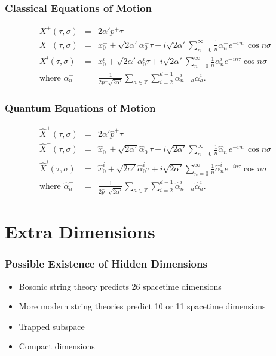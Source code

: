\documentclass{beamer}
\begin{document}
\begin{frame}
\frametitle{Classical Equations of Motion}

\begin{eqnarray*}
X^+(\tau, \sigma) &=& 2\alpha'p^+ \tau \\
X^-(\tau, \sigma) &=& x_0^- + \sqrt{2\alpha'} \alpha_0^- \tau + i\sqrt{2\alpha'}\sum_{n=0}^\infty \frac{1}{n} \alpha_n^- e^{-in\tau} \cos n\sigma\\
X^i (\tau, \sigma) &=& x_0^i + \sqrt{2\alpha'} \alpha_0^i \tau + i\sqrt{2\alpha'}\sum_{n=0}^\infty \frac{1}{n} \alpha_n^i e^{-in\tau} \cos n\sigma\\
\text{where} \,\, \alpha^-_n&=& \frac{1}{2p^+\sqrt{2\alpha'}}\sum_{a \in \mathbb{Z}}\sum_{i=2}^{d-1}\alpha^i_{n-a}\alpha^i_a.
\end{eqnarray*}

\end{frame}

\begin{frame}
\frametitle{Quantum Equations of Motion}

\begin{eqnarray*}
\hat{X}^+(\tau, \sigma) &=& 2\alpha'\hat{p}^+ \tau \\
\hat{X}^-(\tau, \sigma) &=& \hat{x}_0^- + \sqrt{2\alpha'} \hat{\alpha}_0^- \tau + i\sqrt{2\alpha'}\sum_{n=0}^\infty \frac{1}{n} \hat{\alpha}_n^- e^{-in\tau} \cos n\sigma\\
\hat{X}^i (\tau, \sigma) &=& \hat{x}_0^i + \sqrt{2\alpha'} \hat{\alpha}_0^i \tau + i\sqrt{2\alpha'}\sum_{n=0}^\infty \frac{1}{n} \hat{\alpha}_n^i e^{-in\tau} \cos n\sigma\\
\text{where} \,\, \hat{\alpha}^-_n&=& \frac{1}{2\hat{p}^+\sqrt{2\alpha'}}\sum_{a \in \mathbb{Z}}\sum_{i=2}^{d-1}\hat{\alpha}^i_{n-a}\hat{\alpha}^i_a.
\end{eqnarray*}

\end{frame}

\section{Extra Dimensions}
\begin{frame}
\frametitle{Possible Existence of Hidden Dimensions}
\begin{itemize}
\item{Bosonic string theory predicts 26 spacetime dimensions}
\item{More modern string theories predict 10 or 11 spacetime dimensions}
\item{Trapped subspace}
\item{Compact dimensions}
\end{itemize}
\end{frame}
\end{document}
